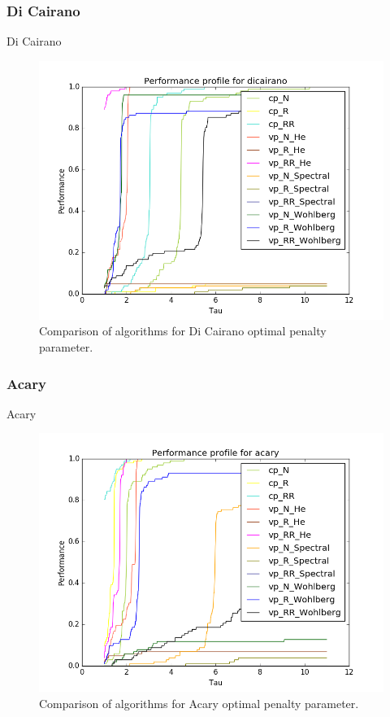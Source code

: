 \documentclass[8pt,red]{beamer}
\theoremstyle{plain}
\theoremstyle{definition}
\theoremstyle{remark}
\begin{document}
\subsubsection{Di Cairano}
\begin{frame}{Di Cairano}
\begin{figure}[hbtp]
\centering
\includegraphics[scale=0.4]{Results/DiCairano_mini.png}
\caption{Comparison of algorithms for Di Cairano optimal penalty parameter.}
\end{figure}
\end{frame}

\subsubsection{Acary}
\begin{frame}{Acary}
\begin{figure}[hbtp]
\centering
\includegraphics[scale=0.4]{Results/Acary_mini.png}
\caption{Comparison of algorithms for Acary optimal penalty parameter.}
\end{figure}
\end{frame}
\end{document}
